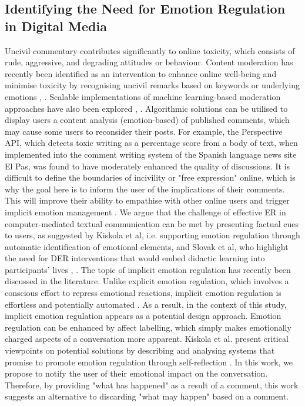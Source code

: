 \subsection{Identifying the Need for Emotion Regulation in Digital Media}
Uncivil commentary contributes significantly to online toxicity, which consists of rude, aggressive, and degrading attitudes or behaviour. Content moderation has recently been identified as an intervention to enhance online well-being and minimise toxicity by recognising uncivil remarks based on keywords or underlying emotions \cite{thomas2022s}, \cite{jhaver2021evaluating}. Scalable implementations of machine learning-based moderation approaches have also been explored \cite{gorwa2020algorithmic}, \cite{gillespie2020content}. Algorithmic solutions can be utilised to display users a content analysis (emotion-based) of published comments, which may cause some users to reconsider their posts. For example, the Perspective API, which detects toxic writing as a percentage score from a body of text, when implemented into the comment writing system of the Spanish language news site El Pas, was found to have moderately enhanced the quality of discussions. It is difficult to define the boundaries of incivility or "free expression" online, which is why the goal here is to inform the user of the implications of their comments. This will improve their ability to empathise with other online users and trigger implicit emotion management \cite{walther1993impression}. We argue that the challenge of effective ER in computer-mediated textual communication can be met by presenting factual cues to users, as suggested by Kiskola et al, i.e. supporting emotion regulation through automatic identification of emotional elements, and Slovak et al, who highlight the need for DER interventions that would embed didactic learning into participants' lives \cite{kiskola2021applying}, \cite{slovak2022designing}.  The topic of implicit emotion regulation has recently been discussed in the literature. Unlike explicit emotion regulation, which involves a conscious effort to repress emotional reactions, implicit emotion regulation is effortless and potentially automated \cite{torre2018putting}. As a result, in the context of this study, implicit emotion regulation appears as a potential design approach. Emotion regulation can be enhanced by affect labelling, which simply makes emotionally charged aspects of a conversation more apparent. Kiskola et al. present critical viewpoints on potential solutions by describing and analysing systems that promise to promote emotion regulation through self-reflection \cite{kiskola2021applying}. In this work, we propose to notify the user of their emotional impact on the conversation. Therefore, by providing "what has happened" as a result of a comment, this work suggests an alternative to discarding "what may happen" based on a comment.

